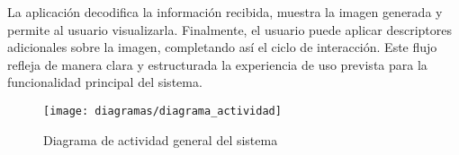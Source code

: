 La aplicación decodifica la información recibida, muestra la imagen generada y permite al usuario visualizarla. Finalmente, el usuario puede aplicar descriptores adicionales sobre la imagen, completando así el ciclo de interacción. Este flujo refleja de manera clara y estructurada la experiencia de uso prevista para la funcionalidad principal del sistema.


\begin{figure}[H]
    \centering
    \texttt{[image: diagramas/diagrama\_actividad]}
    \caption{Diagrama de actividad general del sistema}
    \label{fig:diagrama-actividad}
\end{figure}


